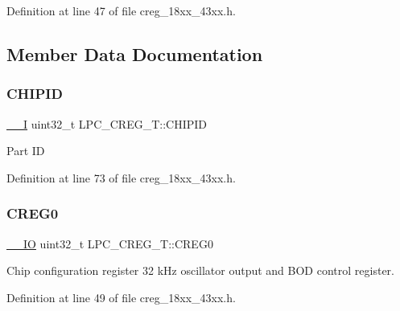 Definition at line 47 of file creg\+\_\+18xx\+\_\+43xx.\+h.



\subsection{Member Data Documentation}
\mbox{\label{struct_l_p_c___c_r_e_g___t_ad6fe369a3db4a2e68c062d5b6a54c8e3}} 
\subsubsection{\texorpdfstring{C\+H\+I\+P\+ID}{CHIPID}}
{\footnotesize\ttfamily \hyperlink{core__sc300_8h_af63697ed9952cc71e1225efe205f6cd3}{\+\_\+\+\_\+I} uint32\+\_\+t L\+P\+C\+\_\+\+C\+R\+E\+G\+\_\+\+T\+::\+C\+H\+I\+P\+ID}

Part ID 

Definition at line 73 of file creg\+\_\+18xx\+\_\+43xx.\+h.

\mbox{\label{struct_l_p_c___c_r_e_g___t_a2d4406878e23d28ce7aeffcfc61ed82a}} 
\subsubsection{\texorpdfstring{C\+R\+E\+G0}{CREG0}}
{\footnotesize\ttfamily \hyperlink{core__sc300_8h_aec43007d9998a0a0e01faede4133d6be}{\+\_\+\+\_\+\+IO} uint32\+\_\+t L\+P\+C\+\_\+\+C\+R\+E\+G\+\_\+\+T\+::\+C\+R\+E\+G0}

Chip configuration register 32 k\+Hz oscillator output and B\+OD control register. 

Definition at line 49 of file creg\+\_\+18xx\+\_\+43xx.\+h.

\mbox{\label{struct_l_p_c___c_r_e_g___t_a1a841ba5531670c14b97041e7d9283d5}} 
